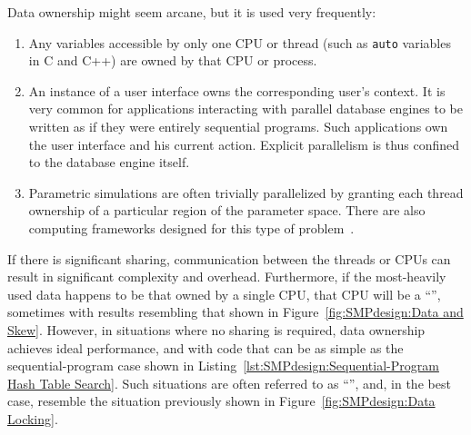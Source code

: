 Data ownership might seem arcane, but it is used very frequently:
\begin{enumerate}
\item	Any variables accessible by only one CPU or thread
	(such as {\tt auto} variables in C
	and C++) are owned by that CPU or process.
\item	An instance of a user interface owns the corresponding
	user's context.
	It is very common for applications interacting with parallel
	database engines to be written as if they were entirely
	sequential programs.
	Such applications own the user interface and his current
	action.
	Explicit parallelism is thus confined to the
	database engine itself.
\item	Parametric simulations are often trivially parallelized
	by granting each thread ownership of a particular region
	of the parameter space.
	There are also computing frameworks designed for this
	type of problem~\cite{BOINC2008}.
\end{enumerate}

If there is significant sharing, communication between the threads
or CPUs can result in significant complexity and overhead.
Furthermore, if the most-heavily used data happens to be that owned
by a single CPU, that CPU will be a ``'', sometimes with
results resembling that shown in Figure~\ref{fig:SMPdesign:Data and Skew}.
However, in situations where no sharing is required, data ownership
achieves ideal performance, and with code that can be as simple
as the sequential-program case shown in
Listing~\ref{lst:SMPdesign:Sequential-Program Hash Table Search}.
Such situations are often referred to as ``'', and, in the best case, resemble the situation
previously shown in Figure~\ref{fig:SMPdesign:Data Locking}.



